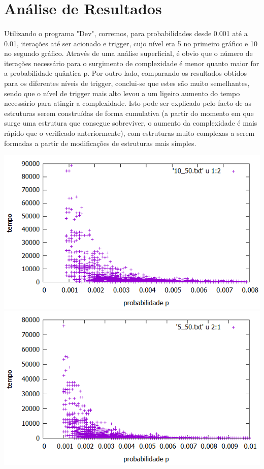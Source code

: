 \documentclass[a4paper,11pt]{book}
\begin{document}
\section{Análise de Resultados}
\paragraph{} 
Utilizando o programa "Dev", corremos, para probabilidades desde 0.001 até a 0.01, iterações até ser acionado e trigger, cujo nível era 5 no primeiro gráfico e 10 no segundo gráfico. Através de uma análise superficial, é obvio que o número de iterações necessário para o surgimento de complexidade é menor quanto maior for a probabilidade quântica p.
\newline 
Por outro lado, comparando os resultados obtidos para os diferentes níveis de trigger, conclui-se que estes são muito semelhantes, sendo que o nível de trigger mais alto levou a um ligeiro aumento do tempo necessário para atingir a complexidade. Isto pode ser explicado pelo facto de as estruturas serem construídas de forma cumulativa (a partir do momento em que surge uma estrutura que consegue sobreviver, o aumento da complexidade é mais rápido que o verificado anteriormente), com estruturas muito complexas a serem formadas a partir de modificações de estruturas mais simples.
\begin{center}
\includegraphics[scale=0.5]{plot_trigger_10.png}
\newline
\includegraphics[scale=0.5]{plot_trigger_5.png}
\end{center}
\end{document}
